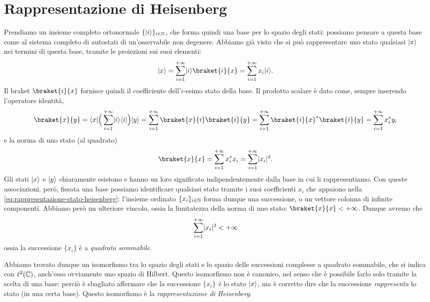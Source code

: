 \section{Rappresentazione di Heisenberg}
Prendiamo un insieme completo ortonormale $\{\lvert i\rangle\}_{i\in\mathbb{N}}$, che forma quindi una base per lo spazio degli stati: possiamo pensare a questa base come al sistema completo di autostati di un'osservabile non degenere.
Abbiamo già visto che si può rappresentare uno stato qualsiasi $\lvert x\rangle$ nei termini di questa base, tramite le proiezioni sui suoi elementi:
\begin{equation}
    \ket{x}=\sum_{i=1}^{+\infty}\ket{i}\braket{i}{x}=\sum_{i=1}^{+\infty}x_i\ket{i}.
	\label{eq:rappresentazione-stato-heisenberg}
\end{equation}
Il braket $\braket{i}{x}$ fornisce quindi il coefficiente dell'$i$-esimo stato della base.
Il prodotto scalare è dato come, sempre inserendo l'operatore identità,
\begin{equation}
	\braket{x}{y}=\bra{x}\Big(\sum_{i=1}^{+\infty}\ket{i}\bra{i}\Big)\ket{y}=\sum_{i=1}^{+\infty}\braket{x}{i}\braket{i}{y}=\sum_{i=1}^{+\infty}\braket{i}{x}^*\braket{i}{y}=\sum_{i=1}^{+\infty}x_i^*y_i
	\label{eq:prodotto-scalare}
\end{equation}
e la norma di uno stato (al quadrato)
\begin{equation}
	\braket{x}{x}=\sum_{i=1}^{+\infty}x_i^*x_i=\sum_{i=1}^{+\infty}\abs{x_i}^2.
	\label{eq:norma-stato}
\end{equation}
Gli stati $\lvert x\rangle$ e $\lvert y\rangle$ chiaramente esistono e hanno un loro significato indipendentemente dalla base in cui li rappresentiamo.
Con queste associazioni, però, fissata una base possiamo identificare qualsiasi stato tramite i suoi coefficienti $x_i$ che appaiono nella \eqref{eq:rappresentazione-stato-heisenberg}: l'insieme ordinato $\{x_i\}_{i\in\mathbb{N}}$ forma dunque una successione, o un vettore colonna di infinite componenti.
Abbiamo però un ulteriore vincolo, ossia la limitatezza della norma di uno stato: $\braket{x}{x}<+\infty$.
Dunque avremo che
\begin{equation}
	\sum_{i=1}^{+\infty}\lvert x_i\rvert^2<+\infty
	\label{eq:successione-quadrato-sommabile}
\end{equation}
ossia la successione $\{x_i\}$ è a \emph{quadrato sommabile}.

Abbiamo trovato dunque un isomorfismo tra lo spazio degli stati e lo spazio delle successioni complesse a quadrato sommabile, che si indica con $\ell^2(\mathbb{C})$, anch'esso ovviamente uno spazio di Hilbert.
Questo isomorfismo non è canonico, nel senso che è possibile farlo solo tramite la scelta di una base: perciò è sbagliato affermare che la successione $\{x_i\}$ \emph{è} lo stato $\lvert x\rangle$, ma è corretto dire che la successione \emph{rappresenta} lo stato (in una certa base).
Questo isomorfismo è la \emph{rappresentazione di Heisenberg}.

